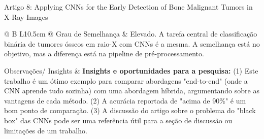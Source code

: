 \documentclass[12pt, a4paper]{article}
\begin{document}
\begin{fichabox}{Artigo 8: Applying CNNs for the Early Detection of Bone Malignant Tumors in X-Ray Images}
\begin{longtable}{@{} B L{10.5cm} @{}}
    Grau de Semelhança & Elevado. A tarefa central de classificação binária de tumores ósseos em raio-X com CNNs é a mesma. A semelhança está no objetivo, mas a diferença está na pipeline de pré-processamento. \\
    \addlinespace
    
    Observações/ Insights & \textbf{Insights e oportunidades para a pesquisa:} (1) Este trabalho é um ótimo exemplo para comparar abordagens "end-to-end" (onde a CNN aprende tudo sozinha) com uma abordagem híbrida, argumentando sobre as vantagens de cada método. (2) A acurácia reportada de "acima de 90\%" é um bom ponto de comparação. (3) A discussão do artigo sobre o problema do "black box" das CNNs pode ser uma referência útil para a seção de discussão ou limitações de um trabalho. \\
    
    \bottomrule
\end{longtable}
\end{fichabox}
\end{document}
